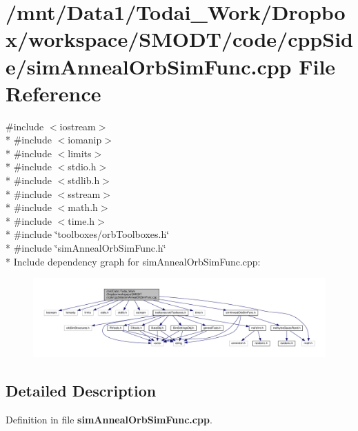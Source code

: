 \section{/mnt/\-Data1/\-Todai\-\_\-\-Work/\-Dropbox/workspace/\-S\-M\-O\-D\-T/code/cpp\-Side/sim\-Anneal\-Orb\-Sim\-Func.cpp File Reference}
\label{sim_anneal_orb_sim_func_8cpp}
{\ttfamily \#include $<$iostream$>$}\\*
{\ttfamily \#include $<$iomanip$>$}\\*
{\ttfamily \#include $<$limits$>$}\\*
{\ttfamily \#include $<$stdio.\-h$>$}\\*
{\ttfamily \#include $<$stdlib.\-h$>$}\\*
{\ttfamily \#include $<$sstream$>$}\\*
{\ttfamily \#include $<$math.\-h$>$}\\*
{\ttfamily \#include $<$time.\-h$>$}\\*
{\ttfamily \#include \char`\"{}toolboxes/orb\-Toolboxes.\-h\char`\"{}}\\*
{\ttfamily \#include \char`\"{}sim\-Anneal\-Orb\-Sim\-Func.\-h\char`\"{}}\\*
Include dependency graph for sim\-Anneal\-Orb\-Sim\-Func.\-cpp\-:\nopagebreak
\begin{figure}[H]
\begin{center}
\leavevmode
\includegraphics[width=350pt]{sim_anneal_orb_sim_func_8cpp__incl}
\end{center}
\end{figure}


\subsection{Detailed Description}


Definition in file {\bf sim\-Anneal\-Orb\-Sim\-Func.\-cpp}.


